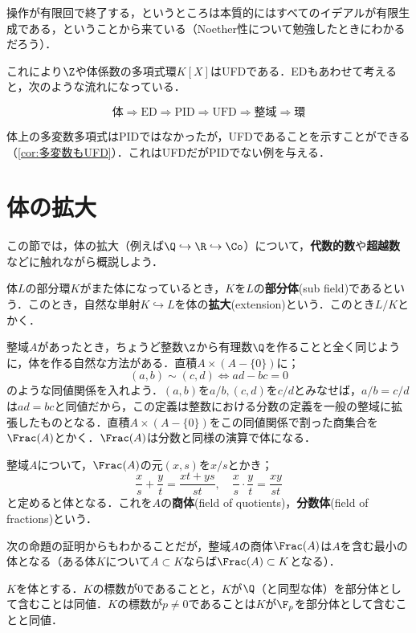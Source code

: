 操作が有限回で終了する，というところは本質的にはすべてのイデアルが有限生成である，ということから来ている（Noether性について勉強したときにわかるだろう）．

これにより$\Z$や体係数の多項式環$K[X]$はUFDである．EDもあわせて考えると，次のような流れになっている．

\[\text{体}\Longrightarrow\text{ED}\Longrightarrow\text{PID}\Longrightarrow\text{UFD}\Longrightarrow\text{整域}\Longrightarrow\text{環}\]

体上の多変数多項式はPIDではなかったが，UFDであることを示すことができる（\ref{cor:多変数もUFD}）．これはUFDだがPIDでない例を与える．

\section{体の拡大}

この節では，体の拡大（例えば$\Q\hookrightarrow\R\hookrightarrow\Co$）について，\textbf{代数的数}や\textbf{超越数}などに触れながら概説しよう．

体$L$の部分環$K$がまた体になっているとき，$K$を$L$の\textbf{部分体}(sub field)であるという．このとき，自然な単射$K\hookrightarrow L$を体の\textbf{拡大}(extension)という．このとき$L/K$とかく．

整域$A$があったとき，ちょうど整数$\Z$から有理数$\Q$を作ることと全く同じように，体を作る自然な方法がある．直積$A\times(A-\{0\})$に；
\[(a,b)\sim(c,d)\Longleftrightarrow ad-bc=0\]
のような同値関係を入れよう．$(a,b)$を$a/b,(c,d)$を$c/d$とみなせば，$a/b=c/d$は$ad=bc$と同値だから，この定義は整数における分数の定義を一般の整域に拡張したものとなる．直積$A\times(A-\{0\})$をこの同値関係で割った商集合を$\Frac (A)$とかく．$\Frac (A)$は分数と同様の演算で体になる．

\begin{defi}[商体]
	整域$A$について，$\Frac (A)$の元$(x,s)$を$x/s$とかき；
	\[\frac{x}{s}+\frac{y}{t}=\frac{xt+ys}{st},\quad \frac{x}{s}\cdot\frac{y}{t}=\frac{xy}{st}\]
	と定めると体となる．これを$A$の\textbf{商体}(field of quotients)，\textbf{分数体}(field of fractions)という．
\end{defi}

次の命題の証明からもわかることだが，整域$A$の商体$\Frac (A)$は$A$を含む最小の体となる（ある体$K$について$A\subset K$ならば$\Frac (A)\subset K$となる）．
\begin{prop}
	$K$を体とする．$K$の標数が0であることと，$K$が$\Q$（と同型な体）を部分体として含むことは同値．$K$の標数が$p\neq0$であることは$K$が$\F_p$を部分体として含むことと同値．
\end{prop}

